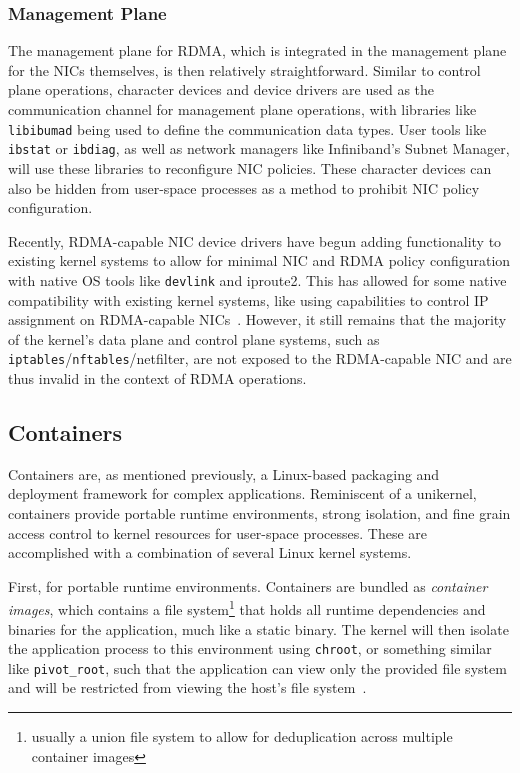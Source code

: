 \documentclass[12pt,titlepage]{article}
\begin{document}
\subsubsection{Management Plane}\label{subsubsec:Management Plane}
The management plane for RDMA, which is integrated in the management plane for the NICs themselves, is then relatively straightforward.
Similar to control plane operations, character devices and device drivers are used as the communication channel for management plane operations, with libraries like \texttt{libibumad} being used to define the communication data types.
User tools like \texttt{ibstat} or \texttt{ibdiag}, as well as network managers like Infiniband's Subnet Manager, will use these libraries to reconfigure NIC policies.
These character devices can also be hidden from user-space processes as a method to prohibit NIC policy configuration.

Recently, RDMA-capable NIC device drivers have begun adding functionality to existing kernel systems to allow for minimal NIC and RDMA policy configuration with native OS tools like \texttt{devlink} and iproute2.
This has allowed for some native compatibility with existing kernel systems, like using capabilities to control IP assignment on RDMA-capable NICs~\cite{mlnxofedmanual}.
However, it still remains that the majority of the kernel's data plane and control plane systems, such as \texttt{iptables}/\texttt{nftables}/netfilter, are not exposed to the RDMA-capable NIC and are thus invalid in the context of RDMA operations.

\subsection{Containers}\label{subsec:Containers}
Containers are, as mentioned previously, a Linux-based packaging and deployment framework for complex applications.
Reminiscent of a unikernel, containers provide portable runtime environments, strong isolation, and fine grain access control to kernel resources for user-space processes.
These are accomplished with a combination of several Linux kernel systems.

First, for portable runtime environments.
Containers are bundled as \textit{container images}, which contains a file system\footnote{usually a union file system to allow for deduplication across multiple container images} that holds all runtime dependencies and binaries for the application, much like a static binary.
The kernel will then isolate the application process to this environment using \texttt{chroot}, or something similar like \texttt{pivot\_root}, such that the application can view only the provided file system and will be restricted from viewing the host's file system~\cite{dockerunderthehood}.
\end{document}
